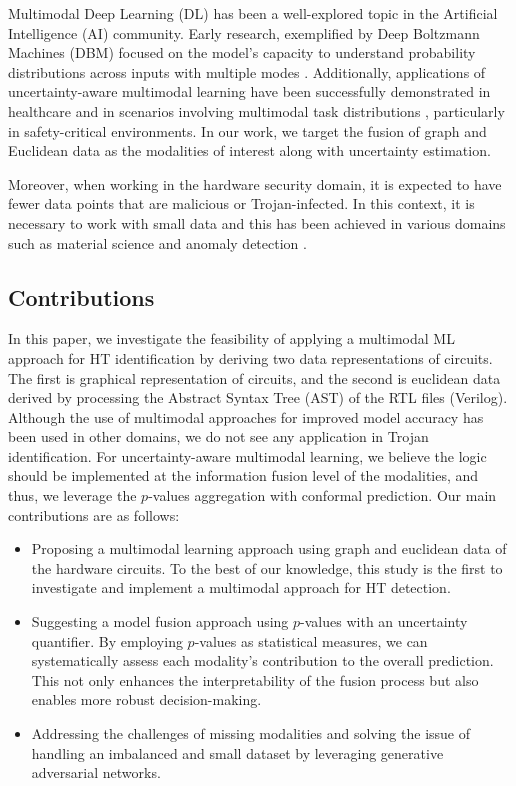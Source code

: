 Multimodal Deep Learning (DL) has been a well-explored topic in the Artificial Intelligence (AI) community. Early research, exemplified by Deep Boltzmann Machines (DBM) focused on the model's capacity to understand probability distributions across inputs with multiple modes \cite{srivastava2012multimodal}. Additionally, applications of uncertainty-aware multimodal learning \cite{wang2022uncertaintyaware} have been successfully demonstrated in healthcare \cite{sarawgi2021uncertainty} and in scenarios involving multimodal task distributions \cite{almecija2022uncertaintyaware}, particularly in safety-critical environments. In our work, we target the fusion of graph \cite{ektefaie2023multimodal, kim2023heterogeneous} and Euclidean data as the modalities of interest along with uncertainty estimation. 

Moreover, when working in the hardware security domain, it is expected to have fewer data points that are malicious or Trojan-infected. In this context, it is necessary to work with small data \cite{nyiri2023can} and this has been achieved in various domains such as material science \cite{xu2023small} and anomaly detection \cite{ghamisi2023anomaly}.

\subsection*{Contributions}
In this paper, we investigate the feasibility of applying a multimodal ML approach for HT identification by deriving two data representations of circuits. The first is graphical representation \cite{yu2021hw2vec} of circuits, and the second is euclidean data \cite{px6s-sm21-22} derived by processing the Abstract Syntax Tree (AST) of the RTL files (Verilog). Although the use of multimodal approaches for improved model accuracy has been used in other domains, we do not see any application in Trojan identification. For uncertainty-aware multimodal learning, we believe the logic should be implemented at the information fusion level of the modalities, and thus, we leverage the $p$-values aggregation with conformal prediction. Our main contributions are as follows:
\begin{itemize}
    \item Proposing a multimodal learning approach using graph and euclidean data of the hardware circuits. To the best of our knowledge, this study is the first to investigate and implement a multimodal approach for HT detection.
    \item Suggesting a model fusion approach using $p$-values with an uncertainty quantifier. By employing $p$-values as statistical measures, we can systematically assess each modality's contribution to the overall prediction. This not only enhances the interpretability of the fusion process but also enables more robust decision-making.
    \item Addressing the challenges of missing modalities and solving the issue of handling an imbalanced and small dataset by leveraging generative adversarial networks.
\end{itemize}


